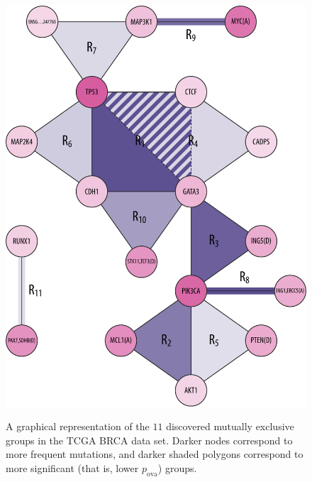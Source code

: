 \begin{figure}[htbp]
\centering
\includegraphics[width=\textwidth]{figures/genes/graph_brca.pdf}\\[1em]
\caption{A graphical representation of the $11$ discovered mutually exclusive groups in the TCGA BRCA data set.
Darker nodes correspond to more frequent mutations, and darker shaded polygons correspond to more significant (that is, lower $p_{\mathrm{ova}}$) groups.}
\label{fig:graph_brca}
\end{figure}

